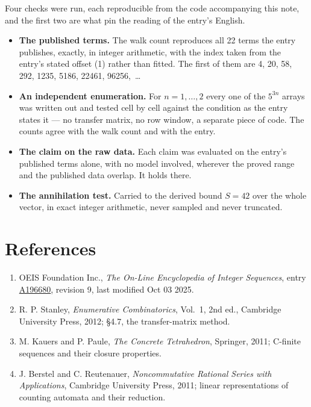 \documentclass[11pt]{article}
\theoremstyle{definition}
\begin{document}
Four checks were run, each reproducible from the code accompanying this note, and the first two are what pin the reading of the entry's English.

\begin{itemize}

\item {\bfseries The published terms.} The walk count reproduces all 22 terms the entry publishes, exactly, in integer arithmetic, with the index taken from the entry's stated offset (1) rather than fitted. The first of them are 4, 20, 58, 292, 1235, 5186, 22461, 96256,~\dots

\item {\bfseries An independent enumeration.} For $n = 1,\dots,2$ every one of the $5^{3n}$ arrays was written out and tested cell by cell against the condition as the entry states it --- no transfer matrix, no row window, a separate piece of code. The counts agree with the walk count and with the entry.

\item {\bfseries The claim on the raw data.} Each claim was evaluated on the entry's published terms alone, with no model involved, wherever the proved range and the published data overlap. It holds there.

\item {\bfseries The annihilation test.} Carried to the derived bound $S = 42$ over the whole vector, in exact integer arithmetic, never sampled and never truncated.

\end{itemize}

\section{References}

\begin{enumerate}

\item OEIS Foundation Inc., \emph{The On-Line Encyclopedia of Integer Sequences}, entry \href{https://oeis.org/A196680}{A196680}, revision 9, last modified Oct 03 2025.

\item R. P. Stanley, \emph{Enumerative Combinatorics}, Vol.~1, 2nd ed., Cambridge University Press, 2012; \S4.7, the transfer-matrix method.

\item M. Kauers and P. Paule, \emph{The Concrete Tetrahedron}, Springer, 2011; C-finite sequences and their closure properties.

\item J. Berstel and C. Reutenauer, \emph{Noncommutative Rational Series with Applications}, Cambridge University Press, 2011; linear representations of counting automata and their reduction.

\end{enumerate}
\end{document}
